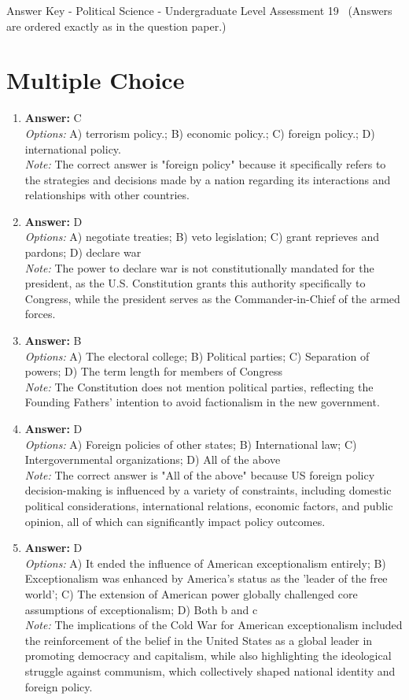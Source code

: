 \documentclass[12pt]{article}
\begin{document}
\begin{center}
Answer Key - Political Science - Undergraduate Level Assessment 19 \
\small (Answers are ordered exactly as in the question paper.)
\end{center}

\section*{Multiple Choice}
\begin{enumerate}[label=\arabic*.]
\item \textbf{Answer:} C
\\ \textit{Options:} A) terrorism policy.; B) economic policy.; C) foreign policy.; D) international policy.
\\ \textit{Note:} The correct answer is "foreign policy" because it specifically refers to the strategies and decisions made by a nation regarding its interactions and relationships with other countries.
\item \textbf{Answer:} D
\\ \textit{Options:} A) negotiate treaties; B) veto legislation; C) grant reprieves and pardons; D) declare war
\\ \textit{Note:} The power to declare war is not constitutionally mandated for the president, as the U.S. Constitution grants this authority specifically to Congress, while the president serves as the Commander-in-Chief of the armed forces.
\item \textbf{Answer:} B
\\ \textit{Options:} A) The electoral college; B) Political parties; C) Separation of powers; D) The term length for members of Congress
\\ \textit{Note:} The Constitution does not mention political parties, reflecting the Founding Fathers' intention to avoid factionalism in the new government.
\item \textbf{Answer:} D
\\ \textit{Options:} A) Foreign policies of other states; B) International law; C) Intergovernmental organizations; D) All of the above
\\ \textit{Note:} The correct answer is "All of the above" because US foreign policy decision-making is influenced by a variety of constraints, including domestic political considerations, international relations, economic factors, and public opinion, all of which can significantly impact policy outcomes.
\item \textbf{Answer:} D
\\ \textit{Options:} A) It ended the influence of American exceptionalism entirely; B) Exceptionalism was enhanced by America's status as the 'leader of the free world'; C) The extension of American power globally challenged core assumptions of exceptionalism; D) Both b and c
\\ \textit{Note:} The implications of the Cold War for American exceptionalism included the reinforcement of the belief in the United States as a global leader in promoting democracy and capitalism, while also highlighting the ideological struggle against communism, which collectively shaped national identity and foreign policy.
\end{enumerate}
\end{document}
